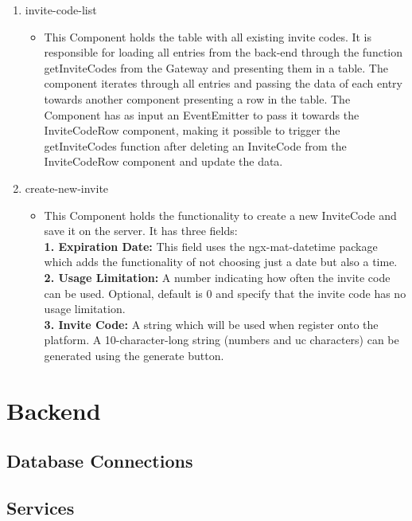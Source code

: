 \begin{enumerate}
\item invite-code-list
	\begin{itemize}
		\item This Component holds the table with all existing invite codes. It is responsible for loading all entries from the back-end through the function getInviteCodes from the Gateway and presenting them in a table. The component iterates through all entries and passing the data of each entry towards another component presenting a row in the table. The Component has as input an EventEmitter to pass it towards the InviteCodeRow component, making it possible to trigger the getInviteCodes function after deleting an InviteCode from the InviteCodeRow component and update the data.
	\end{itemize}
\item create-new-invite
	\begin{itemize}
		\item This Component holds the functionality to create a new InviteCode and save it on the server. It has three fields: \\  
		\textbf{1.	Expiration Date:} This field uses the ngx-mat-datetime package which adds the functionality of not choosing just a date but also a time. \\
		\textbf{2.	Usage Limitation:} A number indicating how often the invite code can be used. Optional, default is 0 and specify that the invite code has no usage limitation. \\
		\textbf{3.	Invite Code:} A string which will be used when register onto the platform. A 10-character-long string (numbers and uc characters) can be generated using the generate button.\\	
	\end{itemize}	
\end{enumerate}

\section{Backend}

\subsection{Database Connections}

\subsection{Services}

